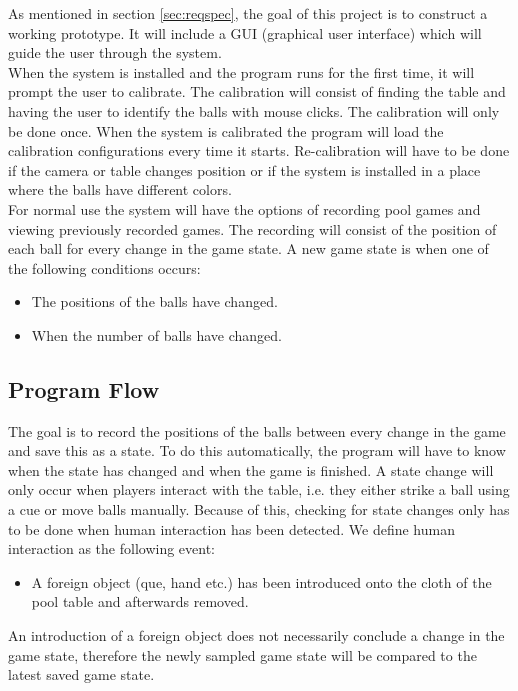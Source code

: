 As mentioned in section \ref{sec:reqspec}, the goal of this project is to construct a working prototype. It will include a GUI (graphical user interface) which will guide the user through the system.\\

When the system is installed and the program runs for the first time, it will prompt the user to calibrate. The calibration will consist of finding the table and having the user to identify the balls with mouse clicks. The calibration will only be done once. When the system is calibrated the program will load the calibration configurations every time it starts. Re-calibration will have to be done if the camera or table changes position or if the system is installed in a place where the balls have different colors.\\

For normal use the system will have the options of recording pool games and viewing previously recorded games. The recording will consist of the position of each ball for every change in the game state. A new game state is when one of the following conditions occurs:\\ 
\begin{itemize}
	\item The positions of the balls have changed.
	\item When the number of balls have changed.
\end{itemize}

\subsection{Program Flow}
The goal is to record the positions of the balls between every change in the game and save this as a state. To do this automatically, the program will have to know when the state has changed and when the game is finished. A state change will only occur when players interact with the table, i.e. they either strike a ball using a cue or move balls manually. Because of this, checking for state changes only has to be done when human interaction has been detected. We define human interaction as the following event:
\begin{itemize}
	\item  A foreign object (que, hand etc.) has been introduced onto the cloth of the pool table and afterwards removed.
\end{itemize}

An introduction of a foreign object does not necessarily conclude a change in the game state, therefore the newly sampled game state will be compared to the latest saved game state.

